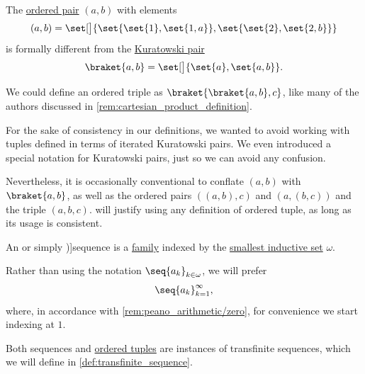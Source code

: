 \begin{remark}\label{rem:kuratowski_pairs_and_tuples}
  The \hyperref[def:ordered_tuple]{ordered pair} \( (a, b) \) with elements
  \begin{equation*}
    (a, b) = \set[\big]{ \set{ \set{ 1 }, \set{ 1, a } }, \set{ \set{ 2 }, \set{ 2, b } } }
  \end{equation*}
  is formally different from the \hyperref[def:kuratowski_pair]{Kuratowski pair}
  \begin{equation*}
    \braket{ a, b } = \set[\big]{ \set{ a }, \set{ a, b } }.
  \end{equation*}

  We could define an ordered triple as \( \braket{ \braket{ a, b }, c } \), like many of the authors discussed in \cref{rem:cartesian_product_definition}.

  For the sake of consistency in our definitions, we wanted to avoid working with tuples defined in terms of iterated Kuratowski pairs. We even introduced a special notation for Kuratowski pairs, just so we can avoid any confusion.

  Nevertheless, it is occasionally conventional to conflate \( (a, b) \) with \( \braket{ a, b } \), as well as the ordered pairs \( ((a, b), c) \) and \( (a, (b, c)) \) and the triple \( (a, b, c) \).  will justify using any definition of ordered tuple, as long as its usage is consistent.
\end{remark}

\begin{definition}\label{def:sequence}
  An  or simply \term[ru=последовательность (\cite[193]{Герасимов2014Вычислимость})]{sequence} is a \hyperref[def:indexed_family]{family} indexed by the \hyperref[def:smallest_inductive_set]{smallest inductive set} \( \omega \).

  Rather than using the notation \( \seq{ a_k }_{k \in \omega} \), we will prefer
  \begin{equation*}
    \seq{ a_k }_{k=1}^\infty,
  \end{equation*}
  where, in accordance with \cref{rem:peano_arithmetic/zero}, for convenience we start indexing at \( 1 \).
\end{definition}
\begin{comments}
  \item Both sequences and \hyperref[def:ordered_tuple]{ordered tuples} are instances of transfinite sequences, which we will define in \cref{def:transfinite_sequence}.
\end{comments}

